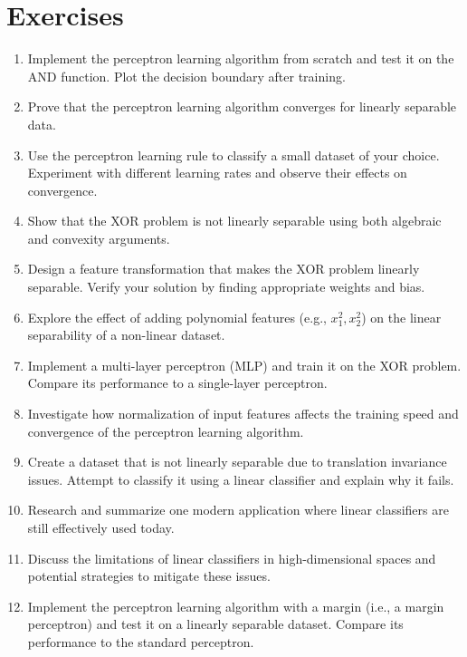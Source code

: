 \section{Exercises} 
\begin{enumerate}
    \item Implement the perceptron learning algorithm from scratch and test it on the AND function. Plot the decision boundary after training.
    \item Prove that the perceptron learning algorithm converges for linearly separable data.
    \item Use the perceptron learning rule to classify a small dataset of your choice. Experiment with different learning rates and observe their effects on convergence.
    \item Show that the XOR problem is not linearly separable using both algebraic and convexity arguments.
    \item Design a feature transformation that makes the XOR problem linearly separable. Verify your solution by finding appropriate weights and bias.
    \item Explore the effect of adding polynomial features (e.g., \(x_1^2, x_2^2\)) on the linear separability of a non-linear dataset.
    \item Implement a multi-layer perceptron (MLP) and train it on the XOR problem. Compare its performance to a single-layer perceptron.
    \item Investigate how normalization of input features affects the training speed and convergence of the perceptron learning algorithm.
    \item Create a dataset that is not linearly separable due to translation invariance issues. Attempt to classify it using a linear classifier and explain why it fails.
    \item Research and summarize one modern application where linear classifiers are still effectively used today.
    \item Discuss the limitations of linear classifiers in high-dimensional spaces and potential strategies to mitigate these issues.
    \item Implement the perceptron learning algorithm with a margin (i.e., a margin perceptron) and test it on a linearly separable dataset. Compare its performance to the standard perceptron.
\end{enumerate}

